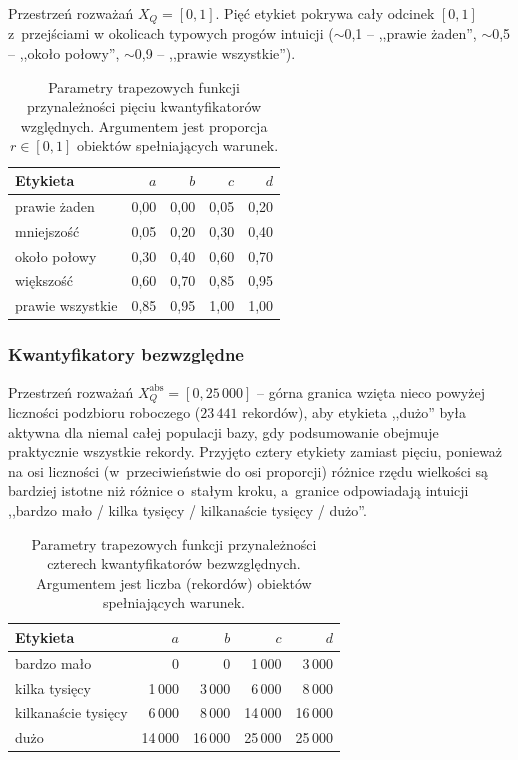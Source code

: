\documentclass{article}
\begin{document}
Przestrzeń rozważań $X_Q = [0, 1]$. Pięć etykiet pokrywa cały odcinek
$[0,1]$ z~przejściami w okolicach typowych progów intuicji
($\sim$0,1 -- ,,prawie żaden'', $\sim$0,5 -- ,,około połowy'',
$\sim$0,9 -- ,,prawie wszystkie'').

\begin{table}[H]
\centering
\caption{Parametry trapezowych funkcji przynależności pięciu
kwantyfikatorów względnych. Argumentem jest proporcja
$r \in [0,1]$ obiektów spełniających warunek.}
\label{tab:q-relative}
\begin{tabular}{l r r r r}
\toprule
Etykieta & $a$ & $b$ & $c$ & $d$ \\
\midrule
prawie żaden     & 0{,}00 & 0{,}00 & 0{,}05 & 0{,}20 \\
mniejszość       & 0{,}05 & 0{,}20 & 0{,}30 & 0{,}40 \\
około połowy     & 0{,}30 & 0{,}40 & 0{,}60 & 0{,}70 \\
większość        & 0{,}60 & 0{,}70 & 0{,}85 & 0{,}95 \\
prawie wszystkie & 0{,}85 & 0{,}95 & 1{,}00 & 1{,}00 \\
\bottomrule
\end{tabular}
\end{table}

\subsubsection{Kwantyfikatory bezwzględne}

Przestrzeń rozważań $X_Q^{\text{abs}} = [0, 25\,000]$ -- górna granica
wzięta nieco powyżej liczności podzbioru roboczego ($23\,441$
rekordów), aby etykieta ,,dużo'' była aktywna dla niemal całej
populacji bazy, gdy podsumowanie obejmuje praktycznie wszystkie
rekordy. Przyjęto cztery etykiety zamiast pięciu, ponieważ na osi
liczności (w~przeciwieństwie do osi proporcji) różnice rzędu wielkości
są bardziej istotne niż różnice o~stałym kroku, a~granice odpowiadają
intuicji ,,bardzo mało / kilka tysięcy / kilkanaście tysięcy / dużo''.

\begin{table}[H]
\centering
\caption{Parametry trapezowych funkcji przynależności czterech
kwantyfikatorów bezwzględnych. Argumentem jest liczba (rekordów) obiektów
spełniających warunek.}
\label{tab:q-absolute}
\begin{tabular}{l r r r r}
\toprule
Etykieta & $a$ & $b$ & $c$ & $d$ \\
\midrule
bardzo mało           &      0 &      0 &  1\,000 &  3\,000 \\
kilka tysięcy         &  1\,000 &  3\,000 &  6\,000 &  8\,000 \\
kilkanaście tysięcy   &  6\,000 &  8\,000 & 14\,000 & 16\,000 \\
dużo                  & 14\,000 & 16\,000 & 25\,000 & 25\,000 \\
\bottomrule
\end{tabular}
\end{table}
\end{document}
